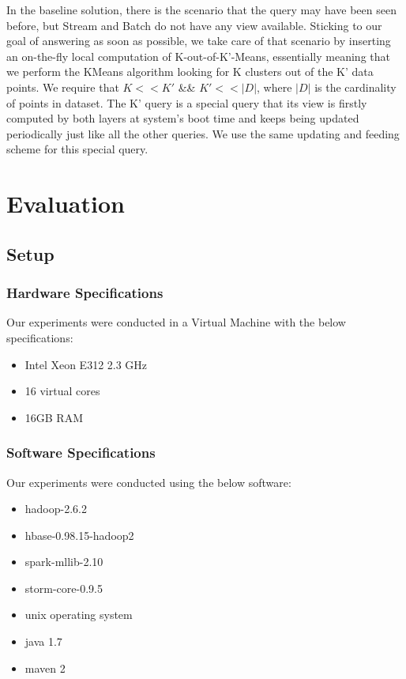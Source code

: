 \documentclass{lmproj}
\begin{document}
In the baseline solution, there is the scenario that the query may have been seen before, but Stream and Batch do not have any view available. Sticking to our goal of answering as soon as possible, we take care of that scenario by inserting an on-the-fly local computation of K-out-of-K'-Means, essentially meaning that we perform the KMeans algorithm looking for K clusters out of the K' data points. We require that $K<<K'$ \&\& $K'<<|D|$, where $|D|$ is the cardinality of points in dataset. The K' query is a special query that its view is firstly computed by both layers at system's boot time and keeps being updated periodically just like all the other queries. We use the same updating and feeding scheme for this special query.


\chapter{Evaluation}
\label{evaluation}

\section{Setup}
\label{evaluation}

\subsection{Hardware Specifications}
Our experiments were conducted in a Virtual Machine with the below specifications:
\begin{itemize}
	\item Intel Xeon E312 2.3 GHz 
	\item 16 virtual cores 
	\item 16GB RAM
\end{itemize}

\subsection{Software Specifications}
Our experiments were conducted using the below software:
\begin{itemize}
	\item hadoop-2.6.2
	\item hbase-0.98.15-hadoop2
	\item spark-mllib-2.10
	\item storm-core-0.9.5
	\item unix operating system
	\item java 1.7
	\item maven 2
\end{itemize}
\end{document}
